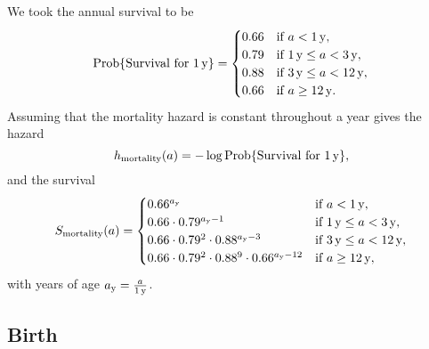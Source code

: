\documentclass[12pt, USenglish]{article}  %
\DeclareMathOperator{\Prob}{Prob}
\begin{document}
We took the annual survival to be
\begin{equation}
  \Prob\{\text{Survival for $\unit[1]{y}$}\}
  =
  \begin{cases}
    0.66 & \text{if $a < \unit[1]{y}$},
    \\
    0.79 & \text{if $\unit[1]{y} \leq a < \unit[3]{y}$},
    \\
    0.88 & \text{if $\unit[3]{y} \leq a < \unit[12]{y}$},
    \\
    0.66 & \text{if $a \geq \unit[12]{y}$}.
  \end{cases}
\end{equation}
Assuming that the mortality hazard is constant throughout a year gives
the hazard
\begin{equation}
  h_{\text{mortality}}(a)
  = - \log \Prob\{\text{Survival for $\unit[1]{y}$}\},
\end{equation}
and the survival
\begin{equation}
  \begin{split}
    S_{\text{mortality}}(a)
    =
    \begin{cases}
      0.66^{a_{\mathrm{y}}}
      & \text{if $a < \unit[1]{y}$},
      \\
      0.66 \cdot 0.79^{a_{\mathrm{y}} - 1}
      & \text{if $\unit[1]{y} \leq a < \unit[3]{y}$},
      \\
      0.66 \cdot 0.79^2 \cdot 0.88^{a_{\mathrm{y}} - 3}
      & \text{if $\unit[3]{y} \leq a < \unit[12]{y}$},
      \\
      0.66 \cdot 0.79^2 \cdot 0.88^9 \cdot 0.66^{a_{\mathrm{y}} - 12}
      & \text{if $a \geq \unit[12]{y}$},
    \end{cases}
  \end{split}
\end{equation}
with years of age $a_{\mathrm{y}} = \frac{a}{\unit[1]{y}}$.

\subsection{Birth}
\end{document}
